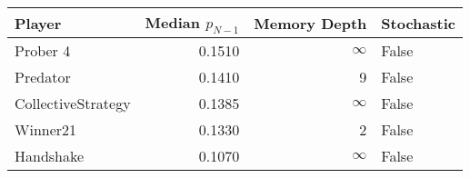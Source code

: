 \begin{tabular}{lrrl}
\toprule
             Player &  Median $p_{N-1}$ &  Memory Depth & Stochastic \\
\midrule
           Prober 4 &            0.1510 &            \(\infty\) &      False \\
           Predator &            0.1410 &             9 &      False \\
 CollectiveStrategy &            0.1385 &            \(\infty\) &      False \\
           Winner21 &            0.1330 &             2 &      False \\
          Handshake &            0.1070 &            \(\infty\) &      False \\
\bottomrule
\end{tabular}
